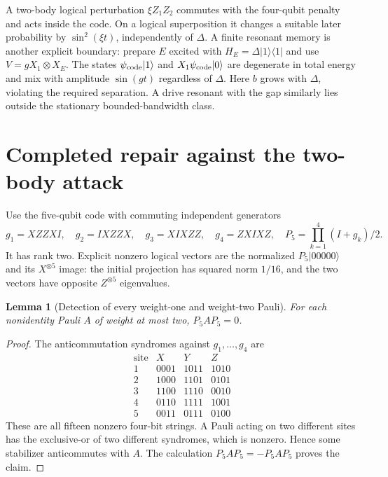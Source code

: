 \documentclass[11pt,oneside,openany]{book}
\newtheorem{lemma}[theorem]{Lemma}
\theoremstyle{definition}
\theoremstyle{remark}\newtheorem{remark}[theorem]{Remark}
\begin{document}
A two-body logical perturbation $\xi Z_1Z_2$ commutes with the four-qubit penalty and acts inside the code. On a logical superposition it changes a suitable later probability by $\sin^2(\xi t)$, independently of $\Delta$. A finite resonant memory is another explicit boundary: prepare $E$ excited with $H_E=\Delta|1\rangle\langle1|$ and use $V=gX_1\otimes X_E$. The states $\psi_{\rm code}|1\rangle$ and $X_1\psi_{\rm code}|0\rangle$ are degenerate in total energy and mix with amplitude $\sin(gt)$ regardless of $\Delta$. Here $b$ grows with $\Delta$, violating the required separation. A drive resonant with the gap similarly lies outside the stationary bounded-bandwidth class.

\section{Completed repair against the two-body attack}

Use the five-qubit code with commuting independent generators
\begin{equation}
 g_1=XZZXI,\quad g_2=IXZZX,\quad
 g_3=XIXZZ,\quad g_4=ZXIXZ,
 \quad P_5=\prod_{k=1}^4(I+g_k)/2.
 \label{prot:fivecode}
\end{equation}
It has rank two. Explicit nonzero logical vectors are the normalized $P_5|00000\rangle$ and its $X^{\otimes5}$ image: the initial projection has squared norm $1/16$, and the two vectors have opposite $Z^{\otimes5}$ eigenvalues.

\begin{lemma}[Detection of every weight-one and weight-two Pauli]
\label{prot:twobody}
For each nonidentity Pauli $A$ of weight at most two, $P_5AP_5=0$.
\end{lemma}
\begin{proof}
The anticommutation syndromes against $g_1,\ldots,g_4$ are
\[
\begin{array}{c|ccc}
\text{site}&X&Y&Z\\\hline
1&0001&1011&1010\\
2&1000&1101&0101\\
3&1100&1110&0010\\
4&0110&1111&1001\\
5&0011&0111&0100
\end{array}
\]
These are all fifteen nonzero four-bit strings. A Pauli acting on two different sites has the exclusive-or of two different syndromes, which is nonzero. Hence some stabilizer anticommutes with $A$. The calculation $P_5AP_5=-P_5AP_5$ proves the claim.
\end{proof}
\end{document}
